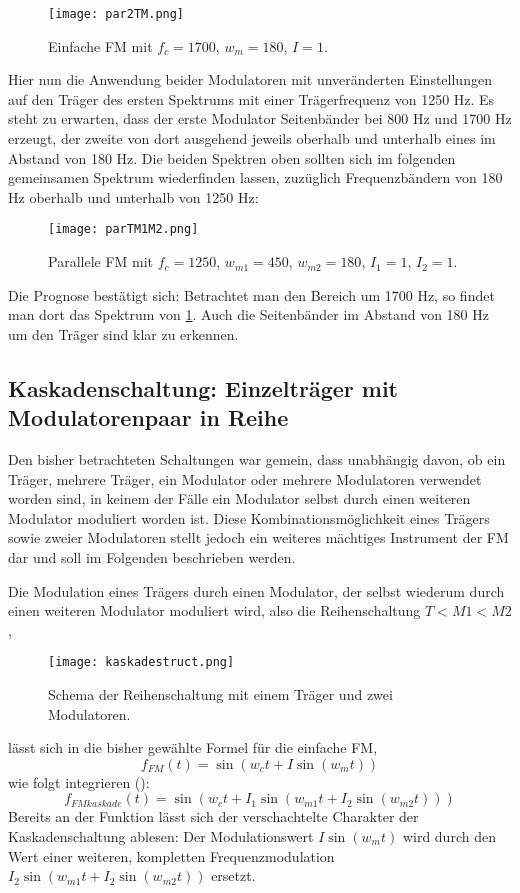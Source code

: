 \FloatBarrier
\begin{figure} [ht]
\label{par1}
\centering
  \texttt{[image: par2TM.png]}
\caption{Einfache FM mit $f_c = 1700$, $w_m = 180$, $I = 1$. }
\end{figure}
\FloatBarrier
Hier nun die Anwendung beider Modulatoren mit unveränderten Einstellungen auf den Träger des ersten Spektrums mit einer Trägerfrequenz von 1250 Hz. Es steht zu erwarten, dass der erste Modulator Seitenbänder bei 800 Hz und 1700 Hz erzeugt, der zweite von dort ausgehend jeweils oberhalb und unterhalb eines im Abstand von 180 Hz. Die beiden Spektren oben sollten sich im folgenden gemeinsamen Spektrum wiederfinden lassen, zuzüglich Frequenzbändern von 180 Hz oberhalb und unterhalb von 1250 Hz:
\FloatBarrier
\begin{figure} [ht]
\centering
  \texttt{[image: parTM1M2.png]}
\caption{Parallele FM mit $f_c = 1250$, $w_{m1} = 450$, $w_{m2} = 180$, $I_1 = 1$, $I_2 = 1$. }
\end{figure}
\FloatBarrier
Die Prognose bestätigt sich: Betrachtet man den Bereich um 1700 Hz, so findet man dort das Spektrum von \ref{par1}. Auch die Seitenbänder im Abstand von 180 Hz um den Träger sind klar zu erkennen.

\subsection{Kaskadenschaltung: Einzelträger mit Modulatorenpaar in Reihe}

\label{cascade}
Den bisher betrachteten Schaltungen war gemein, dass unabhängig davon, ob ein Träger, mehrere Träger, ein Modulator oder mehrere Modulatoren verwendet worden sind, in keinem der Fälle ein Modulator selbst durch einen weiteren Modulator moduliert worden ist. Diese Kombinationsmöglichkeit eines Trägers sowie zweier Modulatoren stellt jedoch ein weiteres mächtiges Instrument der FM dar und soll im Folgenden beschrieben werden. 

Die Modulation eines Trägers durch einen Modulator, der selbst wiederum durch einen weiteren Modulator moduliert wird, also die Reihenschaltung $T<M1<M2$, 
\FloatBarrier
\begin{figure} [ht]
\centering
  \texttt{[image: kaskadestruct.png]}
\caption{Schema der Reihenschaltung mit einem Träger und zwei Modulatoren. }
\end{figure}
\FloatBarrier
lässt sich in die bisher gewählte Formel für die einfache FM,
\begin{equation}\label{eq:fmsimplex}
f_{FM}(t) = \sin(w_ct + I\sin(w_mt))
\end{equation}
wie folgt integrieren (\cite[S.48]{schottstaedt}):
\begin{equation}\label{eq:fmkaskade}
f_{FMkaskade}(t) = \sin(w_ct + I_1\sin(w_{m1}t + I_2\sin(w_{m2}t)))
\end{equation}
Bereits an der Funktion lässt sich der verschachtelte Charakter der Kaskadenschaltung ablesen: Der Modulationswert $ I\sin(w_mt) $ wird durch den Wert einer weiteren, kompletten Frequenzmodulation $ I_2\sin(w_{m1}t + I_2\sin(w_{m2}t)) $ ersetzt. 

